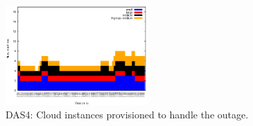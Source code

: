 \begin{figure}[htb]
\begin{minipage}[b]{0.19\linewidth}
	\end{minipage}
\begin{minipage}[b]{0.19\linewidth}
		\vspace{-3mm}
		\includegraphics[width=\linewidth,height=3.8cm]{images/exps2011/high/das/inst_type_machines.eps}
	\end{minipage}
\vspace{-3mm}
\caption{DAS4: Cloud instances provisioned to handle the outage.}
\label{fig:DAS4Instances}
\end{figure}



